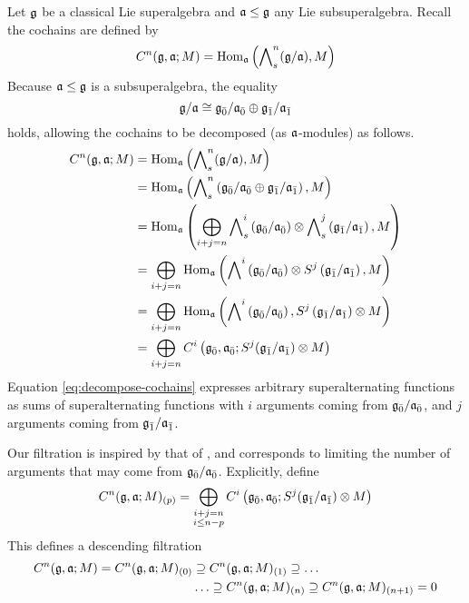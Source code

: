 Let $\mathfrak{g}$ be a classical Lie superalgebra and $\mathfrak{a} \leq \mathfrak{g}$ any Lie subsuperalgebra. Recall the cochains are defined by
\[
    C^n(\mathfrak{g},\mathfrak{a};M) = \operatorname{Hom}_{\mathfrak{a}} \left( \bigwedge\nolimits^{n}_s(\mathfrak{g}/\mathfrak{a}),M \right)
\]
Because $\mathfrak{a} \leq \mathfrak{g}$ is a subsuperalgebra, the equality
\[
  \mathfrak{g}/\mathfrak{a} \cong {\mathfrak{g}}_{\bar{0}} / {\mathfrak{a}}_{\bar{0}} \oplus {\mathfrak{g}}_{\bar{1}}/{\mathfrak{a}}_{\bar{1}}
\]
holds, allowing the cochains to be decomposed (as $\mathfrak{a}$-modules) as follows.
\begin{align} \begin{split} \label{eq:decompose-cochains}
  C^n(\mathfrak{g},\mathfrak{a};M)
  &= \operatorname{Hom}_{\mathfrak{a}} \left( \bigwedge\nolimits^{n}_s(\mathfrak{g}/\mathfrak{a}),M \right)\\
  &= \operatorname{Hom}_{\mathfrak{a}} \left( \bigwedge\nolimits^{n}_s\left({\mathfrak{g}}_{\bar{0}}/{\mathfrak{a}}_{\bar{0}} \oplus {\mathfrak{g}}_{\bar{1}}/{\mathfrak{a}}_{\bar{1}}\right),M \right)\\
  &= \operatorname{Hom}_{\mathfrak{a}} \left( \bigoplus_{i+j = n} \bigwedge\nolimits^{i}_s\left({\mathfrak{g}}_{\bar{0}}/{\mathfrak{a}}_{\bar{0}}\right) \otimes \bigwedge\nolimits^{j}_s\left({\mathfrak{g}}_{\bar{1}}/{\mathfrak{a}}_{\bar{1}}\right), M \right) \\
  &= \bigoplus_{i+j=n} \operatorname{Hom}_{\mathfrak{a}}\left( \bigwedge\nolimits^{i}\left({\mathfrak{g}}_{\bar{0}}/{\mathfrak{a}}_{\bar{0}}\right) \otimes S^j\left({\mathfrak{g}}_{\bar{1}}/{\mathfrak{a}}_{\bar{1}}\right), M  \right)\\
  &= \bigoplus_{i+j=n} \operatorname{Hom}_{\mathfrak{a}}\left( \bigwedge\nolimits^{i}\left({\mathfrak{g}}_{\bar{0}}/{\mathfrak{a}}_{\bar{0}}\right), S^{j}\left({\mathfrak{g}}_{\bar{1}}/{\mathfrak{a}}_{\bar{1}}\right) \otimes M  \right) \\
  &= \bigoplus_{i+j=n} C^i\left({\mathfrak{g}}_{\bar{0}},{\mathfrak{a}}_{\bar{0}}; S^j({\mathfrak{g}}_{\bar{1}}/{\mathfrak{a}}_{\bar{1}})\otimes M\right)
\end{split} \end{align}
Equation \ref{eq:decompose-cochains} expresses arbitrary superalternating functions as sums of superalternating functions with $i$ arguments coming from ${\mathfrak{g}}_{\bar{0}}/{\mathfrak{a}}_{\bar{0}}$, and $j$ arguments coming from ${\mathfrak{g}}_{\bar{1}}/{\mathfrak{a}}_{\bar{1}}$.

Our filtration is inspired by that of \cite{HS-53}, and corresponds to limiting the number of arguments that may come from ${\mathfrak{g}}_{\bar{0}}/{\mathfrak{a}}_{\bar{0}}$. Explicitly, define
\begin{equation}
  \label{eq:define-filtration}
  C^n(\g,\a;M)_{(p)} = \bigoplus_{\substack{i+j=n \\ i \leq n-p}} C^i\left(\even{\g},\even{\a}; S^j(\odd{\g}/\odd{\a})\otimes M\right)
\end{equation}
This defines a descending filtration
\begin{align}\begin{split}\label{eq:desc-filt}
    C^n(\mathfrak{g},\mathfrak{a};M) = C^n(\mathfrak{g},\mathfrak{a};M)_{(0)} &\supseteq  C^n(\mathfrak{g},\mathfrak{a};M)_{(1)} \supseteq \ldots \\
    &\ldots \supseteq C^n(\mathfrak{g},\mathfrak{a};M)_{(n)}  \supseteq C^n(\mathfrak{g},\mathfrak{a};M)_{(n+1)} = 0
 \end{split}
\end{align}

